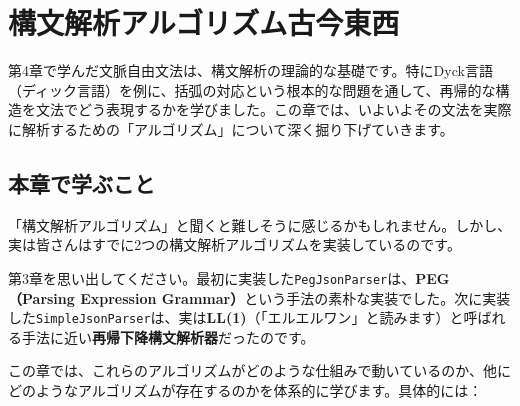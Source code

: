 \hypertarget{chapter5-ux69cbux6587ux89e3ux6790ux30a2ux30ebux30b4ux30eaux30baux30e0ux53e4ux4ecaux6771ux897f}{%
\chapter{構文解析アルゴリズム古今東西}\label{chapter5-ux69cbux6587ux89e3ux6790ux30a2ux30ebux30b4ux30eaux30baux30e0ux53e4ux4ecaux6771ux897f}}

第4章で学んだ文脈自由文法は、構文解析の理論的な基礎です。特にDyck言語（ディック言語）を例に、括弧の対応という根本的な問題を通して、再帰的な構造を文法でどう表現するかを学びました。この章では、いよいよその文法を実際に解析するための「アルゴリズム」について深く掘り下げていきます。

\hypertarget{chapter5-ux672cux7ae0ux3067ux5b66ux3076ux3053ux3068}{%
\section{本章で学ぶこと}\label{chapter5-ux672cux7ae0ux3067ux5b66ux3076ux3053ux3068}}

「構文解析アルゴリズム」と聞くと難しそうに感じるかもしれません。しかし、実は皆さんはすでに2つの構文解析アルゴリズムを実装しているのです。

第3章を思い出してください。最初に実装した\texttt{PegJsonParser}は、\textbf{PEG（Parsing
Expression
Grammar）}という手法の素朴な実装でした。次に実装した\texttt{SimpleJsonParser}は、実は\textbf{LL(1)}（「エルエルワン」と読みます）と呼ばれる手法に近い\textbf{再帰下降構文解析器}だったのです。

この章では、これらのアルゴリズムがどのような仕組みで動いているのか、他にどのようなアルゴリズムが存在するのかを体系的に学びます。具体的には：

